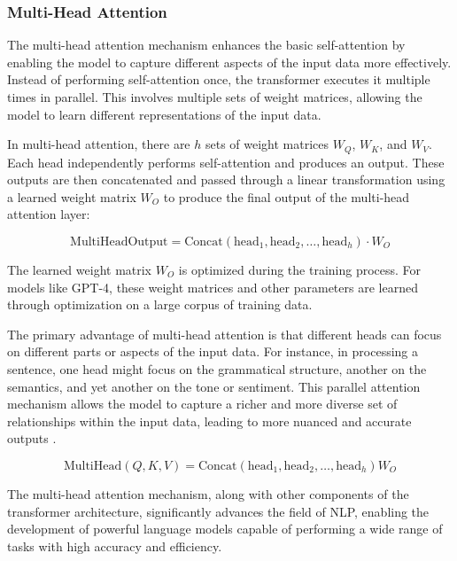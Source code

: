 \begin{itemize}
\subsubsection{Multi-Head Attention}

The multi-head attention mechanism enhances the basic self-attention by enabling the model to capture different aspects of the input data more effectively. Instead of performing self-attention once, the transformer executes it multiple times in parallel. This involves multiple sets of weight matrices, allowing the model to learn different representations of the input data.

In multi-head attention, there are \( h \) sets of weight matrices \( W_Q \), \( W_K \), and \( W_V \). Each head independently performs self-attention and produces an output. These outputs are then concatenated and passed through a linear transformation using a learned weight matrix \( W_O \) to produce the final output of the multi-head attention layer:

\begin{equation}
    \text{MultiHeadOutput} = \text{Concat}(\text{head}_1, \text{head}_2, \ldots, \text{head}_h) \cdot W_O
\end{equation}

The learned weight matrix \( W_O \) is optimized during the training process. For models like GPT-4, these weight matrices and other parameters are learned through optimization on a large corpus of training data.

The primary advantage of multi-head attention is that different heads can focus on different parts or aspects of the input data. For instance, in processing a sentence, one head might focus on the grammatical structure, another on the semantics, and yet another on the tone or sentiment. This parallel attention mechanism allows the model to capture a richer and more diverse set of relationships within the input data, leading to more nuanced and accurate outputs \cite{geeksforgeeks2024-sa}.

\begin{equation}
    \text{MultiHead}(Q, K, V) = \text{Concat}(\text{head}_1, \text{head}_2, \ldots, \text{head}_h)W_O
\end{equation}

The multi-head attention mechanism, along with other components of the transformer architecture, significantly advances the field of NLP, enabling the development of powerful language models capable of performing a wide range of tasks with high accuracy and efficiency.


\end{itemize}
